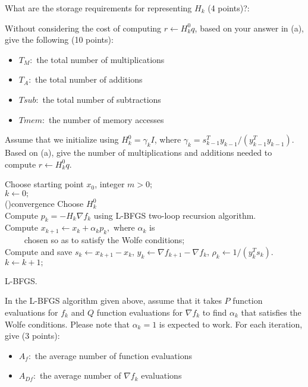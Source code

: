 \documentclass[12pt,legalpaper]{article}
\begin{document}
\noindent What are the storage requirements for representing $H_k$ (4 points)?:

\newpage
\noindent Without considering the cost of computing $r\leftarrow H_k^0 q$, based on your answer in (a), give the following (10 points):
\begin{itemize}
 \item $T_M:$ the total number of multiplications
 \item $T_A:$ the total number of additions
 \item $Tsub:$ the total number of subtractions
 \item $Tmem:$ the number of memory accesses
\end{itemize} 
\vspace{6.0 true in}

 Assume that we initialize using 
$H_k^0=\gamma_k I$, where $\gamma_k=s_{k-1}^T y_{k-1}/(y_{k-1}^T y_{k-1})$.
Based on (a), give the number of multiplications and additions needed to compute $r\leftarrow H_k^0 q$.\\
\newpage

\incmargin{1em}
\linesnumbered
\begin{algorithm}
Choose starting point $x_0$, integer $m>0;$\\
$k\leftarrow 0;$\\
\Repeat(){convergence}{
Choose $H_k^0$\\
Compute $p_k=-H_k\nabla f_k$ using L-BFGS two-loop recursion algorithm.\\
Compute $x_{k+1}\leftarrow x_k + \alpha_k p_k,$ where $\alpha_k$ is \\
$\qquad$  chosen so as to satisfy the Wolfe conditions;\\
Compute and save 
$s_k\leftarrow x_{k+1}-x_k,\, y_k\leftarrow\nabla f_{k+1}-\nabla f_k, \, \rho_k\leftarrow 1/(y_k^T s_k)$.\\
$k\leftarrow k+1;$
}
\caption{L-BFGS.}
\end{algorithm}
\decmargin{1em}
 In the L-BFGS algorithm given above, assume
that it takes $P$ function evaluations for $f_k$ and $Q$ function evaluations
for $\nabla f_k$ to find $\alpha_k$ that satisfies the Wolfe conditions.
Please
note that $\alpha_k=1$ is expected to work. For each iteration, give (3 points):
\begin{itemize}
 \item $A_f:$ the average number of  function evaluations
 \item $A_{Df}:$ the average number of $\nabla f_k$ evaluations
\end{itemize}\\
\vspace{2.0 true in}
\end{document}
